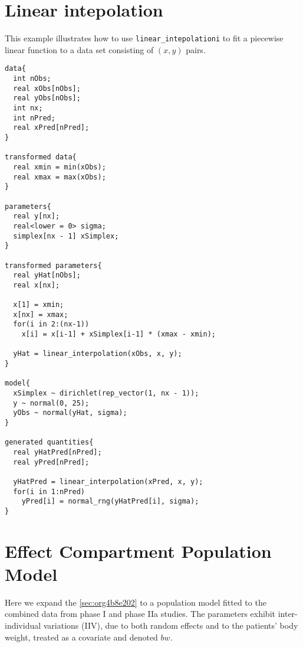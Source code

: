 \documentclass[12pt, reqno, oneside]{amsbook}
\numberwithin{equation}{chapter}
\numberwithin{figure}{chapter}
\numberwithin{table}{chapter}
\theoremstyle{remark}
\begin{document}
\section{Linear intepolation}
\label{sec:orgb89dc56}
This example illustrates how to use \texttt{linear\_intepolationi}
to fit a piecewise linear function to a data set consisting
of \((x, y)\) pairs.
\begin{verbatim}
data{
  int nObs;
  real xObs[nObs];
  real yObs[nObs];
  int nx;
  int nPred;
  real xPred[nPred];
}

transformed data{
  real xmin = min(xObs);
  real xmax = max(xObs);
}

parameters{
  real y[nx];
  real<lower = 0> sigma;
  simplex[nx - 1] xSimplex;
}

transformed parameters{
  real yHat[nObs];
  real x[nx];

  x[1] = xmin;
  x[nx] = xmax;
  for(i in 2:(nx-1))
    x[i] = x[i-1] + xSimplex[i-1] * (xmax - xmin);

  yHat = linear_interpolation(xObs, x, y);
}

model{
  xSimplex ~ dirichlet(rep_vector(1, nx - 1));
  y ~ normal(0, 25);
  yObs ~ normal(yHat, sigma);
}

generated quantities{
  real yHatPred[nPred];
  real yPred[nPred];

  yHatPred = linear_interpolation(xPred, x, y);
  for(i in 1:nPred)
    yPred[i] = normal_rng(yHatPred[i], sigma);
}
\end{verbatim}

\section{Effect Compartment Population Model}
\label{sec:org3aea8e7}
Here we expand the \ref{sec:org4b8e202} to a population model fitted to the
combined data from phase I and phase IIa studies. The
parameters exhibit inter-individual variations (IIV), due to
both random effects and to the patients' body weight,
treated as a covariate and denoted \(bw\).
\end{document}
